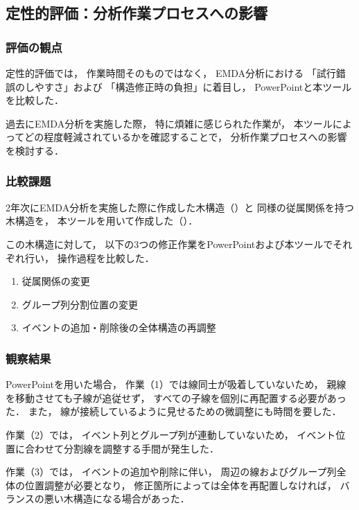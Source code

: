 \subsection{定性的評価：分析作業プロセスへの影響}

\subsubsection{評価の観点}

定性的評価では，
作業時間そのものではなく，
EMDA分析における
「試行錯誤のしやすさ」および
「構造修正時の負担」に着目し，
PowerPointと本ツールを比較した．

過去にEMDA分析を実施した際，
特に煩雑に感じられた作業が，
本ツールによってどの程度軽減されているかを確認することで，
分析作業プロセスへの影響を検討する．


\subsubsection{比較課題}

2年次にEMDA分析を実施した際に作成した木構造（）と
同様の従属関係を持つ木構造を，
本ツールを用いて作成した（）．


この木構造に対して，
以下の3つの修正作業をPowerPointおよび本ツールでそれぞれ行い，
操作過程を比較した．

\begin{enumerate}
  \item 従属関係の変更
  \item グループ列分割位置の変更
  \item イベントの追加・削除後の全体構造の再調整
\end{enumerate}


\subsubsection{観察結果}

PowerPointを用いた場合，
作業（1）では線同士が吸着していないため，
親線を移動させても子線が追従せず，
すべての子線を個別に再配置する必要があった．
また，
線が接続しているように見せるための微調整にも時間を要した．

作業（2）では，
イベント列とグループ列が連動していないため，
イベント位置に合わせて分割線を調整する手間が発生した．

作業（3）では，
イベントの追加や削除に伴い，
周辺の線およびグループ列全体の位置調整が必要となり，
修正箇所によっては全体を再配置しなければ，
バランスの悪い木構造になる場合があった．

